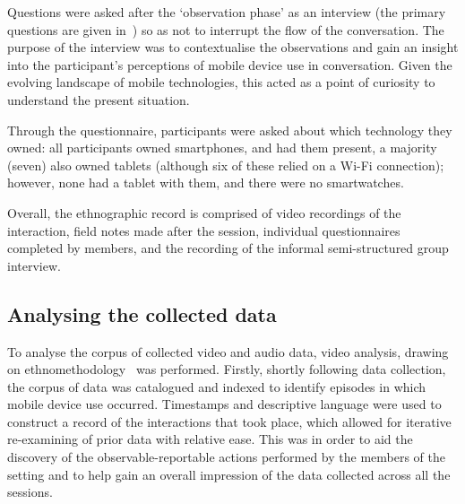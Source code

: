 Questions were asked after the `observation phase' as an interview (the primary questions are given in~) so as not to interrupt the flow of the conversation.
The purpose of the interview was to contextualise the observations and gain an insight into the participant's perceptions of mobile device use in conversation.
Given the evolving landscape of mobile technologies, this acted as a point of curiosity to understand the present situation.

Through the questionnaire, participants were asked about which technology they owned: all participants owned smartphones, and had them present, a majority (seven) also owned tablets (although six of these relied on a Wi-Fi connection); however, none had a tablet with them, and there were no smartwatches.%

Overall, the ethnographic record is comprised of video recordings of the interaction, field notes made after the session, individual questionnaires completed by members, and the recording of the informal semi-structured group  interview.






\subsection{Analysing the collected data}\label{sec:empirical pub design analysis}
To analyse the corpus of collected video and audio data, video analysis, drawing on ethnomethodology~\citep{Goodwin1990,Heath2010} was performed.
Firstly, shortly following data collection, the corpus of data was catalogued and indexed to identify episodes in which mobile device use occurred.
Timestamps and descriptive language were used to construct a record of the interactions that took place, which allowed for iterative re-examining of prior data with relative ease.
This was in order to aid the discovery of the observable-reportable actions performed by the members of the setting and to help gain an overall impression of the data collected across all the sessions.

